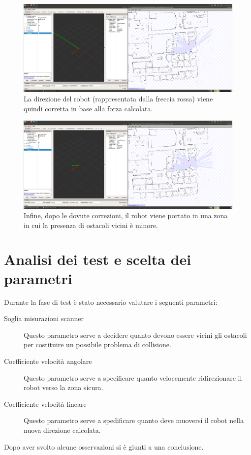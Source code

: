 \documentclass[Lau, binding=0.6cm, oneside]{sapthesis}
\begin{document}
\begin{figure}[htp]
    \centering
    \includegraphics[width=13.5cm]{rviz_force3.png}
    \caption{La direzione del robot (rappresentata dalla freccia rossa) viene quindi corretta in base alla forza calcolata.}
    \label{fig:rviz_force3}
\end{figure}
\begin{figure}[htp]
    \centering
    \includegraphics[width=13.5cm]{rviz_force5.png}
    \caption{Infine, dopo le dovute correzioni, il robot viene portato in una zona in cui la presenza di ostacoli vicini è minore.}
    \label{fig:rviz_force5}
\end{figure}

\section{Analisi dei test e scelta dei parametri}
Durante la fase di test è stato necessario valutare i seguenti parametri:
\begin{description}
    \item[Soglia misurazioni scanner] Questo parametro serve a decidere quanto devono essere vicini gli ostacoli per costituire un possibile problema di collisione.
    \item[Coefficiente velocità angolare] Questo parametro serve a specificare quanto velocemente ridirezionare il robot verso la zona sicura.
    \item[Coefficiente velocità lineare] Questo parametro serve a spedificare quanto deve muoversi il robot nella nuova direzione calcolata.
\end{description}
Dopo aver svolto alcune osservazioni si è giunti a una conclusione.
\end{document}
